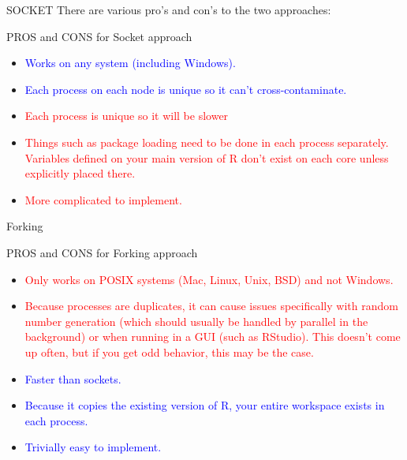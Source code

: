 \documentclass{beamer}\usepackage[]{graphicx}\usepackage[]{xcolor}
\begin{document}
\begin{frame}{SOCKET}
    There are various pro’s and con’s to the two approaches:

\begin{alertblock}{PROS and CONS for Socket approach}
    \begin{itemize}
        \item \textcolor{blue}{Works on any system (including Windows).}
        \item \textcolor{blue}{Each process on each node is unique so it can’t cross-contaminate.}
        \item \textcolor{red}{Each process is unique so it will be slower}
        \item \textcolor{red}{Things such as package loading need to be done in each process separately. Variables defined on your main version of R don’t exist on each core unless explicitly placed there.}
        \item \textcolor{red}{More complicated to implement.}
    \end{itemize}

\end{alertblock}
\end{frame}




\begin{frame}{Forking}
    
\begin{alertblock}{PROS and CONS for Forking approach}
    \begin{itemize}
        \item \textcolor{red}{Only works on POSIX systems (Mac, Linux, Unix, BSD) and not Windows.}
        \item \textcolor{red}{Because processes are duplicates, it can cause issues specifically with random number generation (which should usually be handled by parallel in the background) or when running in a GUI (such as RStudio). This doesn’t come up often, but if you get odd behavior, this may be the case.}
        \item \textcolor{blue}{Faster than sockets.}
        \item \textcolor{blue}{Because it copies the existing version of R, your entire workspace exists in each process.}
        \item \textcolor{blue}{Trivially easy to implement.}
    \end{itemize}

\end{alertblock}
\end{frame}
\end{document}

